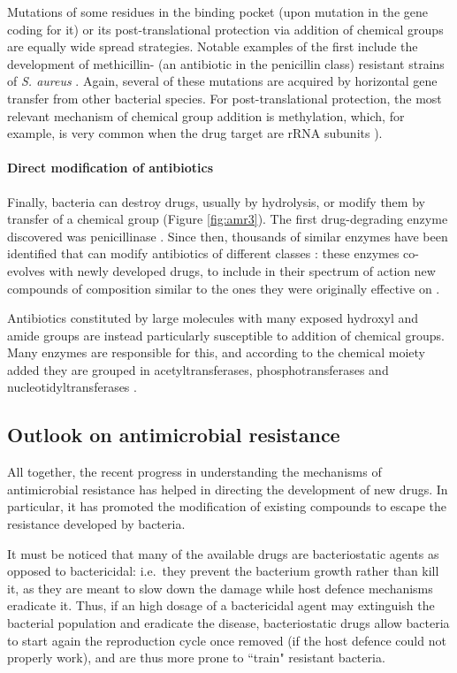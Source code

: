 Mutations of some residues in the binding pocket (upon mutation in the gene coding for it) or its post-translational protection via addition of chemical groups are equally wide spread strategies.
%
Notable examples of the first include the development of methicillin- (an antibiotic in the penicillin class) resistant strains of \emph{S. aureus} \citep{Shore2011,Billal2011}. Again, several of these mutations are acquired by horizontal gene transfer from other bacterial species.
%
For post-translational protection, the most relevant mechanism of chemical group addition is methylation, which, for example, is very common when the drug target are rRNA subunits \citep{Long2006}).


\paragraph{Direct modification of antibiotics}
Finally, bacteria can destroy drugs, usually by hydrolysis, or modify them by transfer of a chemical group (Figure \ref{fig:amr3}).
%
The first drug-degrading enzyme discovered was penicillinase \citep{Abraham1988,Lobanovska2017}. Since then, thousands of similar enzymes have been identified that can modify antibiotics of different classes \citep{Livermore2008,Nordmann2011}:
%
these enzymes co-evolves with newly developed drugs, to include in their spectrum of action new compounds of composition similar to the ones they were originally effective on \citep{Woodford2013}.

Antibiotics constituted by large molecules with many exposed hydroxyl and amide groups are instead particularly susceptible to addition of chemical groups. Many enzymes are responsible for this, and according to the chemical moiety added they are grouped in acetyltransferases, phosphotransferases and nucleotidyltransferases \citep{Wright2005}.


\subsection{Outlook on antimicrobial resistance}
All together, the recent progress in understanding the mechanisms of antimicrobial resistance has helped in directing the development of new drugs. In particular, it has promoted the modification of existing compounds to escape the resistance developed by bacteria.

It must be noticed that many of the available drugs are bacteriostatic agents as opposed to bactericidal: i.e.\ they prevent the bacterium growth rather than kill it, as they are meant to slow down the damage while host defence mechanisms eradicate it.
%
Thus, if an high dosage of a bactericidal agent may extinguish the bacterial population and eradicate the disease, bacteriostatic drugs allow bacteria to start again the reproduction cycle once removed (if the host defence could not properly work), and are thus more prone to ``train" resistant bacteria.

